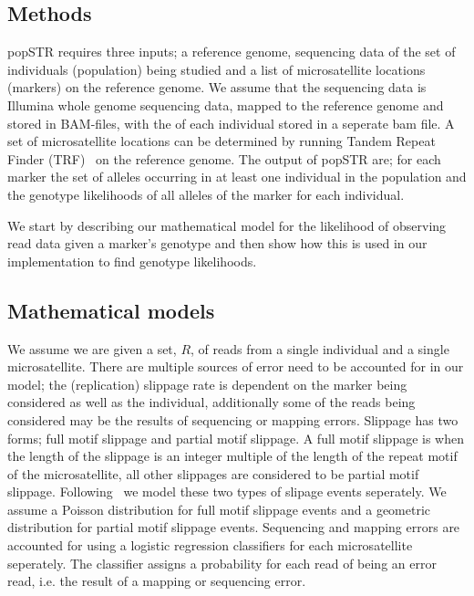 \documentclass{bioinfo}
\begin{document}
\begin{methods}
\section{Methods}
popSTR requires three inputs; a reference genome, sequencing data of the set of individuals (population) being studied and a list of microsatellite locations (markers) on the reference genome.  
We assume that the sequencing data is Illumina whole genome sequencing data, mapped to the reference genome and stored in BAM-files, with the of each individual stored in a seperate bam file.
A set of microsatellite locations can be determined by running Tandem Repeat Finder (TRF)~\cite{trf} on the reference genome.  The output of popSTR are; for each marker the set of alleles occurring 
in at least one individual in the population and the genotype likelihoods of all alleles of the marker for each individual.

We start by describing our mathematical model for the likelihood of observing read data given a marker's genotype and then show how this is used in our implementation to find genotype likelihoods.

\enlargethispage{6pt}
\subsection{Mathematical models}
We assume we are given a set, $R$, of reads from a single individual and a single microsatellite.
There are multiple sources of error need to be accounted for in our model; 
the (replication) slippage rate is dependent on the marker being considered as well as the individual, additionally some of the reads 
being considered may be the results of sequencing or mapping errors.  
Slippage has two forms; full motif slippage and partial motif slippage.  A full motif slippage is when the length of the slippage is an integer multiple of the length of the repeat motif of the 
microsatellite, all other slippages are considered to be partial motif slippage.  Following~\cite{lobSTR} we model these two types of slipage events seperately.
We assume a Poisson distribution for full motif slippage events and a geometric distribution for partial motif slippage events.
Sequencing and mapping errors are accounted for using a logistic regression classifiers for each microsatellite seperately. 
The classifier assigns a probability for each read of being an error read, i.e. the result of a mapping or sequencing error.


\end{methods}
\end{document}
